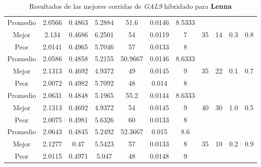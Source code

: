 \begin{table}[h!]
\begin{center}
\begin{tabular}{|c|c|c|c|c|c|c|c|c|c|c|}
        \hline
        \hline
            Promedio  & 2.0566 & 0.4863 & 5.2884 & 51.6 & 0.0146 & 8.5333 &  &  &  & \\
            \cline{1-7}
            Mejor & 2.134 & 0.4686  & 6.2501 & 54 & 0.0119 & 7 & 35 & 14 & 0.3 & 0.8\\
            \cline{1-7}
            Peor & 2.0141 & 0.4965  & 5.7046 & 57 & 0.0133 & 8 &  &  &  & \\
        \hline
        \hline
            Promedio  & 2.0586 & 0.4858 & 5.2155 & 50.9667 & 0.0146 & 8.6333 &  &  &  & \\
            \cline{1-7}
            Mejor & 2.1313 & 0.4692  & 4.9372 & 49 & 0.0145 & 9 & 35 & 22 & 0.1 & 0.7\\
            \cline{1-7}
            Peor & 2.0072 & 0.4982  & 5.7092 & 48 & 0.014 & 8 &  &  &  & \\
        \hline
        \hline
            Promedio  & 2.0631 & 0.4848 & 5.1965 & 55.2 & 0.0144 & 8.6333 &  &  &  & \\
            \cline{1-7}
            Mejor & 2.1313 & 0.4692  & 4.9372 & 54 & 0.0145 & 9 & 40 & 30 & 1.0 & 0.5\\
            \cline{1-7}
            Peor & 2.0075 & 0.4981  & 5.6326 & 60 & 0.0133 & 8 &  &  &  & \\
        \hline
        \hline
            Promedio  & 2.0643 & 0.4845 & 5.2492 & 52.3667 & 0.015 & 8.6 &  &  &  & \\
            \cline{1-7}
            Mejor & 2.1277 & 0.47  & 5.5423 & 57 & 0.0133 & 8 & 35 & 10 & 0.2 & 0.9\\
            \cline{1-7}
            Peor & 2.0115 & 0.4971  & 5.047 & 48 & 0.0148 & 9 &  &  &  & \\
        \hline
        \end{tabular}
        \caption{Resultados de las mejores corridas de \emph{GAL9} hibridado para {\bf Lenna}}
        \label{tb:tableGAL9}
    \end{center}
\end{table}
